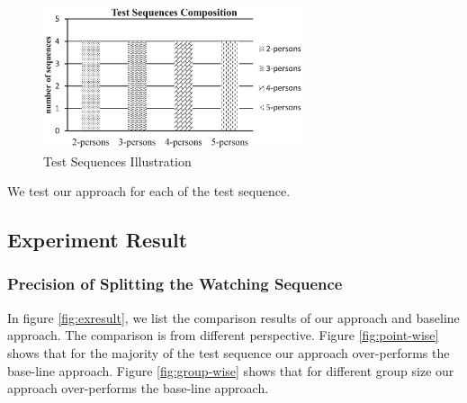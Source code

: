 \begin{figure}[htbp]
\centering
\includegraphics[width=3.0in]{distribution.eps}
\caption{Test Sequences Illustration}
\label{fig:distribution}
\end{figure}

We test our approach for each of the test sequence.

\subsection{Experiment Result}
\subsubsection{Precision of Splitting the Watching Sequence}
In figure \ref{fig:exresult}, we list the comparison results of our approach and baseline approach. The comparison is from different perspective.
Figure \ref{fig:point-wise} shows that for the majority of the test sequence our approach over-performs the base-line approach. Figure \ref{fig:group-wise}
shows that for different group size our approach over-performs the base-line approach.

